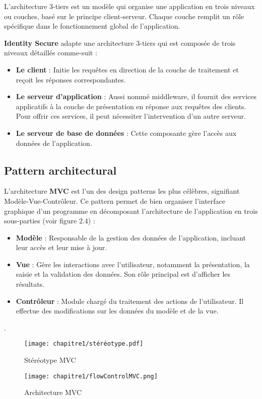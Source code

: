 L'architecture 3-tiers est un modèle qui organise une application en trois niveaux ou couches, basé sur le principe client-serveur. Chaque couche remplit un rôle spécifique dans le fonctionnement global de l'application.

\textbf{Identity Secure} adapte une architecture 3-tiers qui est composée de trois niveaux détaillés comme-suit :\\
\begin{itemize}
    \item \textbf{  Le client} : Initie les requêtes en direction de la couche de traitement et reçoit les réponses correspondantes.
    \item \textbf{ Le serveur d'application} : Aussi nommé middleware, il fournit des services applicatifs à la couche de présentation en réponse aux requêtes des clients. Pour offrir ces services, il peut nécessiter l'intervention d'un autre serveur.
    \item \textbf{ Le serveur de base de données} : Cette composante gère l'accès aux données de l'application.
\end{itemize}


\vspace{1 cm}


\subsection{Pattern architectural}
L'architecture \textbf{MVC} est l'un des design patterns les plus célèbres, signifiant Modèle-Vue-Contrôleur. Ce pattern permet de bien organiser l'interface graphique d'un programme en décomposant l'architecture de l'application en trois sous-parties (voir figure 2.4) :

\begin{itemize}
    \item \textbf{Modèle} : Responsable de la gestion des données de l'application, incluant leur accès et leur mise à jour.

    \item \textbf{Vue} : Gère les interactions avec l'utilisateur, notamment la présentation, la saisie et la validation des données. Son rôle principal est d'afficher les résultats.

    \item \textbf{Contrôleur} : Module chargé du traitement des actions de l'utilisateur. Il effectue des modifications sur les données du modèle et de la vue.
\end{itemize}.
\begin{figure}[H]
\centering

\texttt{[image: chapitre1/stéréotype.pdf]}
\caption{Stéréotype MVC}
\end{figure}
\begin{figure}[H]
\centering

\texttt{[image: chapitre1/flowControlMVC.png]}
\caption{Architecture MVC}
\end{figure}



